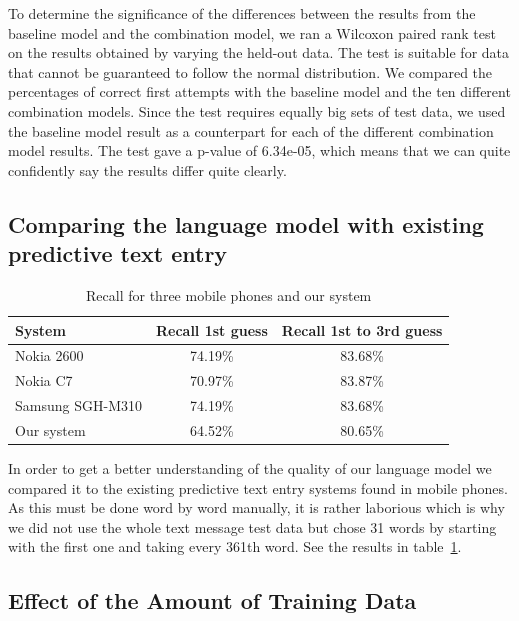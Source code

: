 \documentclass[a4paper,conference]{IEEEtran}
\begin{document}
To determine the significance of the differences between the results
from the baseline model and the combination model, we ran a Wilcoxon
paired rank test on the results obtained by varying the held-out
data. The test is suitable for data that cannot be guaranteed to
follow the normal distribution. We compared the percentages of correct
first attempts with the baseline model and the ten different
combination models. Since the test requires equally big sets of test
data, we used the baseline model result as a counterpart for each of
the different combination model results. The test gave a p-value of
6.34e-05, which means that we can quite confidently say the results
differ quite clearly.

\subsection{Comparing the language model with existing predictive text entry}

\begin{table}[!t]
\begin{center}
\caption{Recall for three mobile phones and our system}
\label{tab:phones}
\begin{tabular} {l c c}
System & Recall 1st guess & Recall 1st to 3rd guess\\
\hline
Nokia 2600 \rule{0pt}{2.6ex}  & 74.19\%          & 83.68\%\\
Nokia C7     & 70.97\%          & 83.87\%\\
Samsung SGH-M310 & 74.19\%      & 83.68\%\\
Our system & 64.52\% & 80.65\%  \\
\hline
\end{tabular}
\end{center}
\end{table}

In order to get a better understanding of the quality of our language
model we compared it to the existing predictive text entry systems
found in mobile phones. As this must be done word by word manually, it
is rather laborious which is why we did not use the whole text message
test data but chose 31 words by starting with the first one and taking
every 361th word. See the results in table~\ref{tab:phones}.

\subsection{Effect of the Amount of Training Data}
\end{document}
